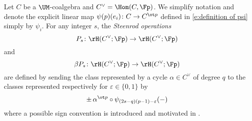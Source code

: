 Let $C$ be a $\UM$-coalgebra and $C^\vee = \Hom(C, \Fp)$.
We simplify notation and denote the explicit linear map $\psi(p)(e_i) \colon C \to C^{\ot p}$ defined in \eqref{e:definition of psi} simply by $\psi_i$.
For any integer $s$, the \textit{Steenrod operations}
\begin{equation*}
P_s \colon \rH(C^\vee; \Fp) \to \rH(C^\vee; \Fp)
\end{equation*}
and
\begin{equation*}
\beta P_s \colon \rH(C^\vee; \Fp) \to \rH(C^\vee; \Fp)
\end{equation*}
are defined by sending the class represented by a cycle $\alpha \in C^\vee$ of degree $q$ to the classes represented respectively for $\varepsilon \in \{0,1\}$ by
\begin{equation*}
\pm \, \alpha^{\ot p} \circ \psi_{(2s-q)(p-1)-\varepsilon}(-)
\end{equation*}
where a possible sign convention is introduced and motivated in \cite[(6.1)]{steenrod1953cyclic}.

